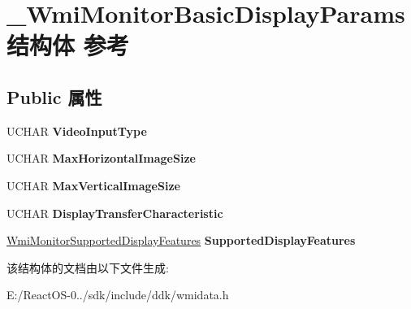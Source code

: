 \hypertarget{struct___wmi_monitor_basic_display_params}{}\section{\+\_\+\+Wmi\+Monitor\+Basic\+Display\+Params结构体 参考}
\label{struct___wmi_monitor_basic_display_params}
\subsection*{Public 属性}
\begin{DoxyCompactItemize}
\item 
\mbox{\label{struct___wmi_monitor_basic_display_params_a2b768fa6a438996e1f482e47ff5c4c0c}} 
U\+C\+H\+AR {\bfseries Video\+Input\+Type}
\item 
\mbox{\label{struct___wmi_monitor_basic_display_params_a4a375f708fd114bf27b42083860756b9}} 
U\+C\+H\+AR {\bfseries Max\+Horizontal\+Image\+Size}
\item 
\mbox{\label{struct___wmi_monitor_basic_display_params_a06ae4600dd83bcc642a479ed4275ca13}} 
U\+C\+H\+AR {\bfseries Max\+Vertical\+Image\+Size}
\item 
\mbox{\label{struct___wmi_monitor_basic_display_params_a59ee47df1ee162aa847e32b414d09775}} 
U\+C\+H\+AR {\bfseries Display\+Transfer\+Characteristic}
\item 
\mbox{\label{struct___wmi_monitor_basic_display_params_a50272401485deb5510e5179f0c228acf}} 
\hyperlink{struct___wmi_monitor_supported_display_features}{Wmi\+Monitor\+Supported\+Display\+Features} {\bfseries Supported\+Display\+Features}
\end{DoxyCompactItemize}


该结构体的文档由以下文件生成\+:\begin{DoxyCompactItemize}
\item 
E\+:/\+React\+O\+S-\/0../sdk/include/ddk/wmidata.\+h\end{DoxyCompactItemize}
